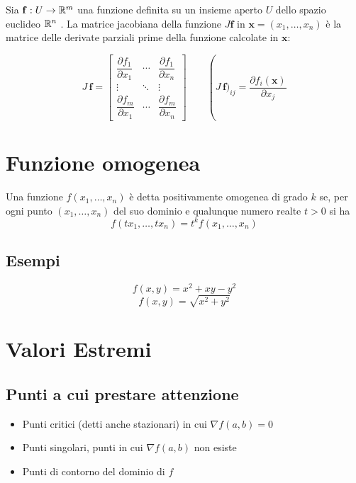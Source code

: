 Sia $\mathbf{f}: U \rightarrow \mathbb{R}^m$ una funzione definita su un insieme aperto $U$ dello spazio euclideo $\mathbb{R}^n$ . La matrice jacobiana della funzione $J {\mathbf f}$ in $\mathbf x = (x_1, \dots, x_n)$ è la matrice delle derivate parziali prime della funzione calcolate in $\mathbf x$:

$$J \, \mathbf f = \begin{bmatrix} \dfrac{\partial f_1}{\partial x_1} & \cdots & \dfrac{\partial f_1}{\partial x_n} \\ \vdots & \ddots & \vdots \\ \dfrac{\partial f_m}{\partial x_1} & \cdots & \dfrac{\partial f_m}{\partial x_n}  \end{bmatrix}\qquad \operatorname (J \, \mathbf f)_{ij} = \frac{\partial f_i (\mathbf {x})}{\partial x_j} $$

\section{Funzione omogenea}

\begin{definition}
Una funzione $f(x_1, \ldots, x_n)$ è detta positivamente omogenea di grado $k$ se, per ogni punto $(x_1, \ldots, x_n)$ del suo dominio e qualunque numero realte $t>0$ si ha
$$ f(tx_1, \ldots, tx_n) = t^k f(x_1, \ldots, x_n)$$

\subsection{Esempi}

$$f(x,y) = x^2 + xy - y^2$$
$$f(x,y) = \sqrt{x^2 + y^2}$$

\end{definition}

\section{Valori Estremi}

\subsection{Punti a cui prestare attenzione}

\begin{itemize}
\item Punti critici (detti anche stazionari) in cui $\nabla f(a,b) = 0$
\item Punti singolari, punti in cui $\nabla f(a,b)$ non esiste
\item Punti di contorno del dominio di $f$
\end{itemize}

